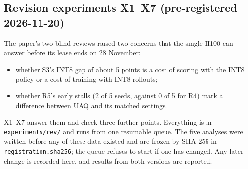 \documentclass[11pt]{article}
\begin{document}
\subsection{Revision experiments X1--X7 (pre-registered 2026-11-20)}\label{sec:rev}
The paper's two blind reviews raised two concerns that the single H100 can answer before its lease ends on 28 November:
\begin{itemize}
\item whether S3's INT8 gap of about 5 points is a cost of scoring with the INT8 policy or a cost of training with INT8 rollouts;
\item whether R5's early stalls (2 of 5 seeds, against 0 of 5 for R4) mark a difference between UAQ and its matched settings.
\end{itemize}
X1--X7 answer them and check three further points. Everything is in \texttt{experiments/rev/} and runs from one resumable queue. The five analyses were written before any of these data existed and are frozen by SHA-256 in \texttt{registration.sha256}; the queue refuses to start if one has changed. Any later change is recorded here, and results from both versions are reported.
\end{document}
